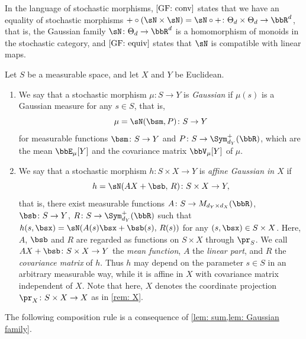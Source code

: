 \documentclass[12pt,reqno]{amsart}%
\theoremstyle{plain}
\theoremstyle{definition}
\def\R{\bbR}
\begin{document}
In the language of stochastic morphisms, $\ref{GF: conv}$ states that
we have an equality of stochastic morphisms
${+}\circ(\sN\times\sN)=\sN\circ{+}\colon\Theta_d\times\Theta_d\rightarrow\R^d$,
that is, the Gaussian family $\sN\colon\Theta_d\rightarrow\R^d$ is a homomorphism of monoids in the stochastic category,
and $\ref{GF: equiv}$ states that $\sN$ is compatible with linear maps.

\begin{definition}\label{def: Gaussian}
	Let $S$ be a measurable space, and let $X$ and $Y$ be Euclidean.
	\begin{enumerate}[label=(\roman*)]
		\item We say that a stochastic morphism $\mu\colon S\rightarrow Y$
		is \emph{Gaussian} if $\mu(s)$ is a Gaussian measure for any $s\in S$, that is,
		\[
			\mu=\sN(\bsm,P)\colon S\rightarrow Y
		\]
		for measurable functions $\bsm\colon S\rightarrow Y$ and $P\colon S\rightarrow\Sym^+_{d_Y}(\R)$,
		which are the mean $\bbE_\mu[Y]$ and the covariance matrix $\bbV_\mu[Y]$ of $\mu$.
		\item We say that a stochastic morphism $h\colon S\times X\rightarrow Y$ is
		\emph{affine Gaussian in $X$} if
		\[
			h=\sN(AX+\bsb,\,R)\colon S\times X\rightarrow Y,
		\]
		that is, 
		there exist measurable functions
		$A\colon S\rightarrow M_{d_Y\times d_X}(\R)$, $\bsb\colon S\rightarrow Y$, $R\colon S\rightarrow\Sym^+_{d_Y}(\R)$ such that
		$h(s,\bsx)=\sN(A(s)\bsx+\bsb(s),\,R(s))$ 
		for any $(s,\bsx)\in S\times X$.			
		Here, $A$, $\bsb$ and $R$ are regarded 
		as functions on $S\times X$ through $\pr_S$.
		We call $AX+\bsb\colon S\times X\rightarrow Y$ the \emph{mean function}, 
		$A$ the \emph{linear part},
		and $R$ the \emph{covariance matrix} of $h$.
		Thus $h$ may depend on the parameter $s\in S$ in an arbitrary measurable way,
		while it is affine in $X$ with covariance matrix independent of $X$.
		Note that here, $X$ denotes the coordinate projection $\pr_X\colon S\times X\rightarrow X$
		as in \cref{rem: X}.
		\end{enumerate}
\end{definition}

The following composition rule is a consequence of \cref{lem: sum,lem: Gaussian family}.
\end{document}
